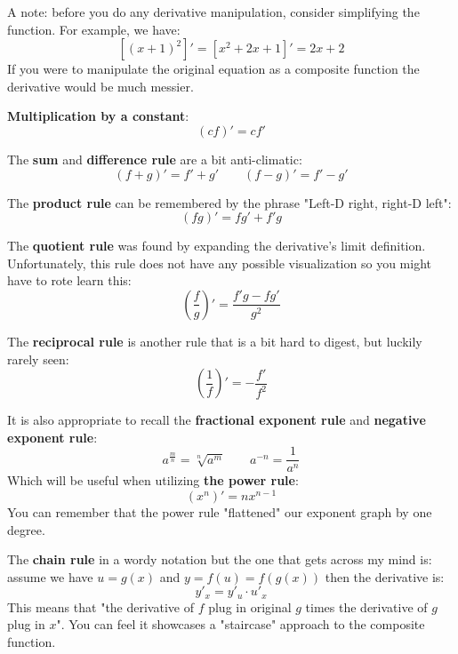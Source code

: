 A note: before you do any derivative manipulation, consider simplifying the function. For example, we have:
\[
    [(x+1)^2]' = [x^2 + 2x + 1]' = 2x + 2
\]
If you were to manipulate the original equation as a composite function the derivative would be much messier.

\textbf{Multiplication by a constant}:
\begin{equation} (cf)' = cf' \end{equation}

The \textbf{sum} and \textbf{difference rule} are a bit anti-climatic:
\begin{equation}
    (f+g)' = f'+g'
    \qquad
    (f-g)' = f'-g'
\end{equation}

The \textbf{product rule} can be remembered by the phrase "Left-D right, right-D left":
\begin{equation}
    (fg)' = fg'+f'g
\end{equation}

The \textbf{quotient rule} was found by expanding the derivative's limit definition. Unfortunately, this rule does not have any possible visualization so you might have to rote learn this:
\begin{equation}
    \left( \frac{f}{g} \right)'
    = \frac{f'g-fg'}{g^2}
\end{equation}

The \textbf{reciprocal rule} is another rule that is a bit hard to digest, but luckily rarely seen:
\begin{equation}
    \left( \frac{1}{f} \right)'
    = -\frac{f'}{f^2}
\end{equation}

It is also appropriate to recall the \textbf{fractional exponent rule} and \textbf{negative exponent rule}:
\begin{equation}
    a^\frac{m}{n} = \sqrt[n]{a^m}
    \qquad
    a^{-n} = \frac{1}{a^n}
\end{equation}
Which will be useful when utilizing \textbf{the power rule}:
\begin{equation} (x^n)' = nx^{n-1} \end{equation}
You can remember that the power rule "flattened" our exponent graph by one degree.

The \textbf{chain rule} in a wordy notation but the one that gets across my mind is: assume we have $u=g(x)$ and $y=f(u)=f(g(x))$ then the derivative is:
\begin{equation}
    y'_x
    = y'_u \cdot u'_x
\end{equation}
This means that "the derivative of $f$ plug in original $g$ times the derivative of $g$ plug in $x$". You can feel it showcases a "staircase" approach to the composite function.

